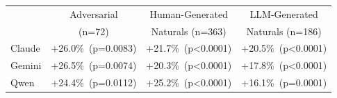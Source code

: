 \begin{tabular}{@{}lccc@{}}
\toprule
 & Adversarial & Human-Generated & LLM-Generated \\
 & (n=72) & Naturals (n=363) & Naturals (n=186) \\
\midrule
Claude & +26.0\%~(p=0.0083) & +21.7\%~(p<0.0001) & +20.5\%~(p<0.0001) \\
Gemini & +26.5\%~(p=0.0074) & +20.3\%~(p<0.0001) & +17.8\%~(p<0.0001) \\
Qwen & +24.4\%~(p=0.0112) & +25.2\%~(p<0.0001) & +16.1\%~(p=0.0001) \\
\bottomrule
\end{tabular}
